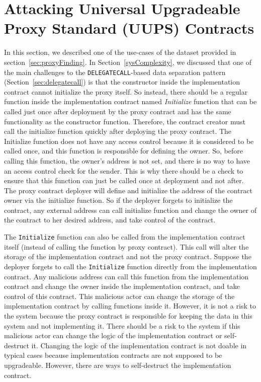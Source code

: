 \section{Attacking Universal Upgradeable Proxy Standard (UUPS) Contracts} 
\label{sec:attackUUPS}
In this section, we described one of the use-cases of the dataset provided in section~\ref{sec:proxyFinding}. In Section~\ref{sysComplexity}, we discussed that one of the main challenges to the \texttt{DELEGATECALL}-based data separation pattern (Section~\ref{sec:delegatecall}) is that the constructor inside the implementation contract cannot initialize the proxy itself. So instead, there should be a regular function inside the implementation contract named \textit{Initialize} function that can be called just once after deployment by the proxy contract and has the same functionality as the constructor function. Therefore, the contract creator must call the initialize function quickly after deploying the proxy contract. The Initialize function does not have any access control because it is considered to be called once, and this function is responsible for defining the owner. So, before calling this function, the owner's address is not set, and there is no way to have an access control check for the sender. This is why there should be a check to ensure that this function can just be called once at deployment and not after. 
The proxy contract deployer will define and initialize the address of the contract owner via the initialize function. So if the deployer forgets to initialize the contract, any external address can call initialize function and change the owner of the contract to her desired address, and take control of the contract.

The \texttt{Initialize} function can also be called from the implementation contract itself (instead of calling the function by proxy contract). This call will alter the storage of the implementation contract and not the proxy contract. Suppose the deployer forgets to call the \texttt{Initialize} function directly from the implementation contract. Any malicious address can call this function from the implementation contract and change the owner inside the implementation contract, and take control of this contract. 
This malicious actor can change the storage of the implementation contract by calling functions inside it. However, it is not a risk to the system because the proxy contract is responsible for keeping the data in this system and not implementing it. There should be a risk to the system if this malicious actor can change the logic of the implementation contract or self-destruct it. Changing the logic of the implementation contract is not doable in typical cases because implementation contracts are not supposed to be upgradeable. However, there are ways to self-destruct the implementation contract. 

